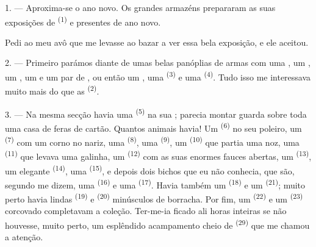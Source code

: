 %
%

\VUsaut{4.0mm}
\VUsaut{2.0mm}
\VUsaut{3.4mm}

1. --- Aproxima-se o ano novo. Os grandes armazéns prepararam as suas
exposições de  \textsuperscript{(1)} e presentes de ano novo.

Pedi ao meu avô que me levasse ao bazar a ver essa bela exposição, e ele
aceitou.

2. --- Primeiro parámos diante de umas belas panóplias de armas com uma
, um , um , um
 e um par de , ou então um ,
uma  \textsuperscript{(3)} e uma  \textsuperscript{(4)}.
Tudo isso me interessava muito mais do que as 
\textsuperscript{(2)}.

\VUsaut{3.0mm}
\VUsaut{2.6mm}

3. --- Na mesma secção havia uma  \textsuperscript{(5)} na sua
; parecia montar guarda sobre toda uma casa de feras de
cartão. Quantos animais havia! Um  \textsuperscript{(6)} no seu
poleiro, um  \textsuperscript{(7)} com um corno no nariz, uma
 \textsuperscript{(8)}, uma  \textsuperscript{(9)}, um
 \textsuperscript{(10)} que partia uma noz, uma 
\textsuperscript{(11)} que levava uma galinha, um 
\textsuperscript{(12)} com as suas enormes fauces abertas, um 
\textsuperscript{(13)}, um elegante  \textsuperscript{(14)}, uma
 \textsuperscript{(15)}, e depois dois bichos que eu não conhecia,
que são, segundo me dizem, uma  \textsuperscript{(16)} e uma
 \textsuperscript{(17)}. Havia também um 
\textsuperscript{(18)} e um  \textsuperscript{(21)}; muito perto havia
lindas  \textsuperscript{(19)} e 
\textsuperscript{(20)} minúsculos de borracha. Por fim, um 
\textsuperscript{(22)} e um  \textsuperscript{(23)} corcovado
completavam a coleção. Ter-me-ia ficado ali horas inteiras se não
houvesse, muito perto, um esplêndido acampamento cheio de
 \textsuperscript{(29)} que me chamou a atenção.

